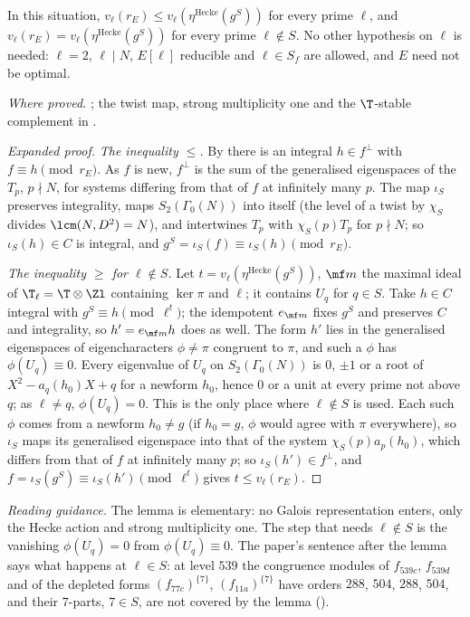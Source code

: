 \begin{sloppypar}
\begin{lemma}\label{lem:paper:step1}
In this situation, $v_\ell(r_E)\le v_\ell(\eta^{\mathrm{Hecke}}(g^S))$ for every prime $\ell$, and $v_\ell(r_E)=v_\ell(\eta^{\mathrm{Hecke}}(g^S))$ for every prime $\ell\notin S$. No other hypothesis
on $\ell$ is needed: $\ell=2$, $\ell\mid N$, $E[\ell]$ reducible and $\ell\in S_f$ are allowed, and $E$ need not be optimal.
\end{lemma}

\noindent\emph{Where proved.} ; the twist map, strong multiplicity one and the $\T$-stable complement in .

\begin{proof}[Expanded proof]
\emph{The inequality $\le$.} By  there is an integral $h\in f^\perp$ with $f\equiv h\pmod{r_E}$. As $f$ is new, $f^\perp$ is the sum of the generalised eigenspaces of
the $T_p$, $p\nmid N$, for systems differing from that of $f$ at infinitely many $p$. The map $\iota_S$ preserves integrality, maps $S_2(\Gamma_0(N))$ into itself (the level of a twist by
$\chi_S$ divides $\lcm(N,D^2)=N$), and intertwines $T_p$ with $\chi_S(p)T_p$ for $p\nmid N$; so $\iota_S(h)\in C$ is integral, and $g^S=\iota_S(f)\equiv\iota_S(h)\pmod{r_E}$.

\emph{The inequality $\ge$ for $\ell\notin S$.} Let $t=v_\ell(\eta^{\mathrm{Hecke}}(g^S))$, $\mf m$ the maximal ideal of $\T_\ell=\T\otimes\Zl$ containing $\ker\pi$ and $\ell$; it contains $U_q$ for
$q\in S$. Take $h\in C$ integral with $g^S\equiv h\pmod{\ell^t}$; the idempotent $e_{\mf m}$ fixes $g^S$ and preserves $C$ and integrality, so $h'=e_{\mf m}h$ does as well. The form $h'$ lies in
the generalised eigenspaces of eigencharacters $\phi\ne\pi$ congruent to $\pi$, and such a $\phi$ has $\phi(U_q)\equiv0$. Every eigenvalue of $U_q$ on $S_2(\Gamma_0(N))$ is $0$, $\pm1$
or a root of $X^2-a_q(h_0)X+q$ for a newform $h_0$, hence $0$ or a unit at every prime not above $q$; as $\ell\ne q$, $\phi(U_q)=0$. This is the only place where $\ell\notin S$ is
used. Each such $\phi$ comes from a newform $h_0\ne g$ (if $h_0=g$, $\phi$ would agree with $\pi$ everywhere), so $\iota_S$ maps its generalised eigenspace into that of the system
$\chi_S(p)a_p(h_0)$, which differs from that of $f$ at infinitely many $p$; so $\iota_S(h')\in f^\perp$, and $f=\iota_S(g^S)\equiv\iota_S(h')\pmod{\ell^t}$ gives $t\le v_\ell(r_E)$.
\end{proof}

\noindent\emph{Reading guidance.} The lemma is elementary: no Galois representation enters, only the Hecke action and strong multiplicity one. The step that needs
$\ell\notin S$ is the vanishing $\phi(U_q)=0$ from $\phi(U_q)\equiv0$. The paper's sentence after the lemma says what happens at $\ell\in S$: at level $539$ the congruence modules of
$f_{539c}$, $f_{539d}$ and of the depleted forms $(f_{77c})^{\{7\}}$, $(f_{11a})^{\{7\}}$ have orders $288$, $504$, $288$, $504$, and their $7$-parts, $7\in S$, are not covered by the lemma
().


\end{sloppypar}
